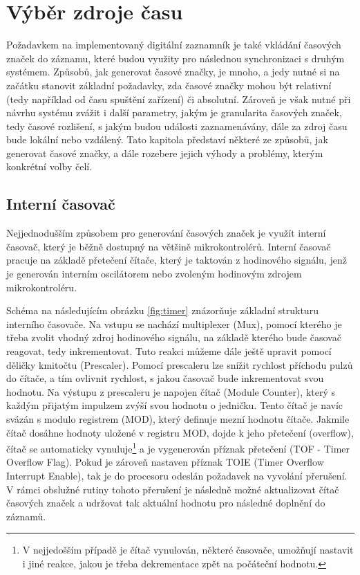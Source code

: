 \section{Výběr zdroje času}
Požadavkem na implementovaný digitální zaznamník  je také vkládání časových značek do záznamu, které budou využity pro následnou synchronizaci s druhým systémem. Způsobů, jak generovat časové značky, je mnoho, a jedy nutné si na začátku stanovit základní požadavky, zda časové značky mohou být relativní (tedy například od času spuštění zařízení) či absolutní. Zároveň je však nutné při návrhu systému zvážit i další parametry, jakým je granularita časových značek, tedy časové rozlišení, s jakým budou události zaznamenávány, dále za zdroj času bude lokální nebo vzdálený. Tato kapitola představí některé ze způsobů, jak generovat časové značky, a dále rozebere jejich výhody a problémy, kterým konkrétní volby čelí. 

\subsection{Interní časovač}
Nejjednodušším způsobem pro generování časových značek je využít interní časovač, který je běžně dostupný na většině mikrokontrolérů. Interní časovač pracuje na základě přetečení čítače, který je taktován z hodinového signálu, jenž je generován interním oscilátorem nebo zvoleným hodinovým zdrojem mikrokontroléru. 

Schéma na následujícím obrázku \ref{fig:timer} znázorňuje základní strukturu interního časovače. Na vstupu se nachází multiplexer (Mux), pomocí kterého je třeba zvolit vhodný zdroj hodinového signálu, na základě kterého bude časovač reagovat, tedy inkrementovat. Tuto reakci můžeme dále ještě upravit pomocí děličky kmitočtu (Prescaler). Pomocí prescaleru lze snížit rychlost příchodu pulzů do čítače, a tím ovlivnit rychlost, s jakou časovač bude inkrementovat svou hodnotu. Na výstupu z prescaleru je napojen čítač (Module Counter), který s každým přijatým impulzem zvýší svou hodnotu o jedničku. Tento čítač je navíc svázán s modulo registrem (MOD), který definuje mezní hodnotu čítače. Jakmile čítač dosáhne hodnoty uložené v registru MOD, dojde k jeho přetečení (overflow), čítač se automaticky vynuluje\footnote{V nejjedošším případě je čítač vynulován, některé časovače, umožňují nastavit i jiné reakce, jakou je třeba dekrementace zpět na počáteční hodnotu.} a je vygenerován příznak přetečení (TOF - Timer Overflow Flag). Pokud je zároveň nastaven příznak TOIE (Timer Overflow Interrupt Enable), tak je do procesoru odeslán požadavek na vyvolání přerušení. V rámci obslužné rutiny tohoto přerušení je následně možné aktualizovat čítač časových značek a udržovat tak aktuální hodnotu pro následné doplnění do záznamů. 

